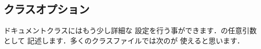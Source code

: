 {\subsection{クラスオプション}
ドキュメントクラスにはもう少し詳細な
設定を行う事ができます．の任意引数として
記述します．多くのクラスファイルでは次のが
使えると思います．
%
%
%
%
%
%
%	
%	
%

}
